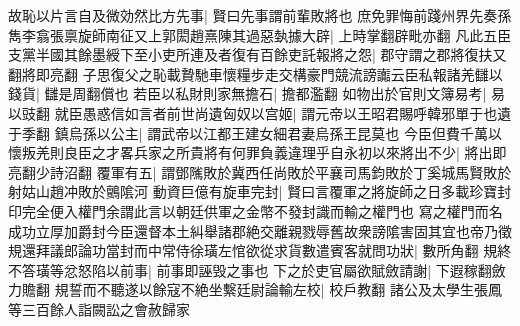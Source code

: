 故恥以片言自及微効然比方先事|{
	賢曰先事謂前輩敗將也}
庶免罪悔前踐州界先奏孫雋李翕張禀旋師南征又上郭閎趙熹陳其過惡埶據大辟|{
	上時掌翻辟毗亦翻}
凡此五臣支黨半國其餘墨綬下至小吏所連及者復有百餘吏託報將之怨|{
	郡守謂之郡將復扶又翻將即亮翻}
子思復父之恥載贄馳車懷糧步走交構豪門競流謗讟云臣私報諸羌讎以錢貨|{
	讎是周翻償也}
若臣以私財則家無擔石|{
	擔都濫翻}
如物出於官則文簿易考|{
	易以豉翻}
就臣愚惑信如言者前世尚遺匈奴以宫姬|{
	謂元帝以王昭君賜呼韓邪單于也遺于季翻}
鎮烏孫以公主|{
	謂武帝以江都王建女細君妻烏孫王昆莫也}
今臣但費千萬以懷叛羌則良臣之才畧兵家之所貴將有何罪負義違理乎自永初以來將出不少|{
	將出即亮翻少詩沼翻}
覆軍有五|{
	謂鄧隲敗於冀西任尚敗於平襄司馬鈞敗於丁奚城馬賢敗於射姑山趙冲敗於鸇隂河}
動資巨億有旋車完封|{
	賢曰言覆軍之將旋師之日多載珍寶封印完全便入權門余謂此言以朝廷供軍之金幣不發封識而輸之權門也}
寫之權門而名成功立厚加爵封今臣還督本土糾舉諸郡絶交離親戮辱舊故衆謗隂害固其宜也帝乃徵規還拜議郎論功當封而中常侍徐璜左悺欲從求貨數遣賓客就問功狀|{
	數所角翻}
規終不答璜等忿怒陷以前事|{
	前事即誣毁之事也}
下之於吏官屬欲賦斂請謝|{
	下遐稼翻斂力贍翻}
規誓而不聽遂以餘寇不絶坐繫廷尉論輸左校|{
	校戶教翻}
諸公及太學生張鳳等三百餘人詣闕訟之會赦歸家

